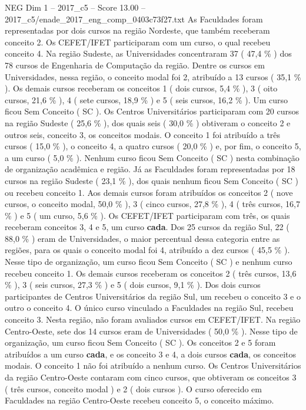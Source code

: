 \begin{textsample}{NEG Dim 1 – 2017\_c5 – Score 13.00 – 2017\_c5/enade\_2017\_eng\_comp\_0403c73f27.txt}
As Faculdades foram representadas por dois cursos na região Nordeste, que também receberam conceito 2.
Os CEFET/IFET participaram com um curso, o qual recebeu conceito 4.
Na região Sudeste, as Universidades concentraram 37 ( 47,4 \% ) dos 78 cursos de Engenharia de Computação da região.
Dentre os cursos em Universidades, nessa região, o conceito modal foi 2, atribuído a 13 cursos ( 35,1 \% ).
Os demais cursos receberam os conceitos 1 ( dois cursos, 5,4 \% ), 3 ( oito cursos, 21,6 \% ), 4 ( sete cursos, 18,9 \% ) e 5 ( seis cursos, 16,2 \% ).
Um curso ficou Sem Conceito ( SC ).
Os Centros Universitários participaram com 20 cursos na região Sudeste ( 25,6 \% ), dos quais seis ( 30,0 \% ) obtiveram o conceito 2 e outros seis, conceito 3, os conceitos modais.
O conceito 1 foi atribuído a três cursos ( 15,0 \% ), o conceito 4, a quatro cursos ( 20,0 \% ) e, por fim, o conceito 5, a um curso ( 5,0 \% ).
Nenhum curso ficou Sem Conceito ( SC ) nesta combinação de organização acadêmica e região.
Já as Faculdades foram representadas por 18 cursos na região Sudeste ( 23,1 \% ), dos quais nenhum ficou Sem Conceito ( SC ) ou recebeu conceito 1.
Aos demais cursos foram atribuídos os conceitos 2 ( nove cursos, o conceito modal, 50,0 \% ), 3 ( cinco cursos, 27,8 \% ), 4 ( três cursos, 16,7 \% ) e 5 ( um curso, 5,6 \% ).
Os CEFET/IFET participaram com três, os quais receberam conceitos 3, 4 e 5, um curso \textbf{cada}.
Dos 25 cursos da região Sul, 22 ( 88,0 \% ) eram de Universidades, o maior percentual dessa categoria entre as regiões, para os quais o conceito modal foi 4, atribuído a dez cursos ( 45,5 \% ).
Nesse tipo de organização, um curso ficou Sem Conceito ( SC ) e nenhum curso recebeu conceito 1.
Os demais cursos receberam os conceitos 2 ( três cursos, 13,6 \% ), 3 ( seis cursos, 27,3 \% ) e 5 ( dois cursos, 9,1 \% ).
Dos dois cursos participantes de Centros Universitários da região Sul, um recebeu o conceito 3 e o outro o conceito 4.
O único curso vinculado a Faculdades na região Sul, recebeu conceito 3.
Nesta região, não foram avaliados cursos em CEFET/IFET.
Na região Centro-Oeste, sete dos 14 cursos eram de Universidades ( 50,0 \% ).
Nesse tipo de organização, um curso ficou Sem Conceito ( SC ).
Os conceitos 2 e 5 foram atribuídos a um curso \textbf{cada}, e os conceito 3 e 4, a dois cursos \textbf{cada}, os conceitos modais.
O conceito 1 não foi atribuído a nenhum curso.
Os Centros Universitários da região Centro-Oeste contaram com cinco cursos, que obtiveram os conceitos 3 ( três cursos, conceito modal ) e 2 ( dois cursos ).
O curso oferecido em Faculdades na região Centro-Oeste recebeu conceito 5, o conceito máximo.

\end{textsample}
